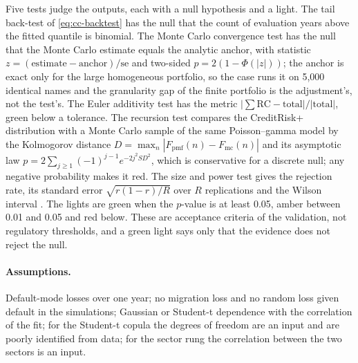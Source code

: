 Five tests judge the outputs, each with a null hypothesis and a light. The tail back-test of \cref{eq:cc-backtest} has the null that the
count of evaluation years above the fitted quantile is binomial. The Monte Carlo convergence test has the null that the Monte Carlo
estimate equals the analytic anchor, with statistic $z=(\text{estimate}-\text{anchor})/\mathrm{se}$ and two-sided $p=2(1-\Phi(|z|))$; the
anchor is exact only for the large homogeneous portfolio, so the case runs it on 5,000 identical names and the granularity gap of the
finite portfolio is the adjustment's, not the test's. The Euler additivity test has the metric $|\sum\mathrm{RC}-\text{total}|/|\text{total}|$,
green below a tolerance. The recursion test compares the CreditRisk+ distribution with a Monte Carlo sample of the same Poisson--gamma
model by the Kolmogorov distance $D=\max_n|F_{\mathrm{pmf}}(n)-F_{\mathrm{mc}}(n)|$ and its asymptotic law
$p=2\sum_{j\ge1}(-1)^{j-1}e^{-2j^2SD^2}$, which is conservative for a discrete null; any negative probability makes it red. The size and
power test gives the rejection rate, its standard error $\sqrt{r(1-r)/R}$ over $R$ replications and the Wilson interval
\citep{credit-capital:wilson1927}. The lights are green when the $p$-value is at least 0.05, amber between 0.01 and 0.05 and red below.
These are acceptance criteria of the validation, not regulatory thresholds, and a green light says only that the evidence does not
reject the null.

\paragraph{Assumptions.} Default-mode losses over one year; no migration loss and no random loss given default in the simulations; Gaussian
or Student-t dependence with the correlation of the fit; for the Student-t copula the degrees of freedom are an input and are poorly
identified from data; for the sector rung the correlation between the two sectors is an input.

